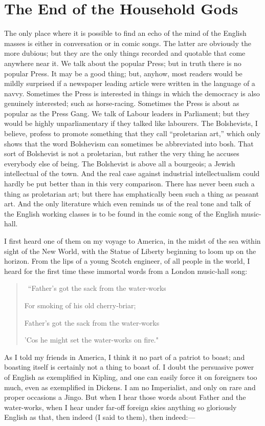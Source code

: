 \documentclass{book}
\begin{document}
\chapter{The End of the Household Gods}
\label{chapter-18}
The only place where it is possible to find an echo of the mind of the English masses is either in conversation or in comic songs. The latter are obviously the more dubious; but they are the only things recorded and quotable that come anywhere near it. We talk about the popular Press; but in truth there is no popular Press. It may be a good thing; but, anyhow, most readers would be mildly surprised if a newspaper leading article were written in the language of a navvy. Sometimes the Press is interested in things in which the democracy is also genuinely interested; such as horse-racing. Sometimes the Press is about as popular as the Press Gang. We talk of Labour leaders in Parliament; but they would be highly unparliamentary if they talked like labourers. The Bolshevists, I believe, profess to promote something that they call “proletarian art,” which only shows that the word Bolshevism can sometimes be abbreviated into bosh. That sort of Bolshevist is not a proletarian, but rather the very thing he accuses everybody else of being. The Bolshevist is above all a bourgeois; a Jewish intellectual of the town. And the real case against industrial intellectualism could hardly be put better than in this very comparison. There has never been such a thing as proletarian art; but there has emphatically been such a thing as peasant art. And the only literature which even reminds us of the real tone and talk of the English working classes is to be found in the comic song of the English music-hall.

I first heard one of them on my voyage to America, in the midst of the sea within sight of the New World, with the Statue of Liberty beginning to loom up on the horizon. From the lips of a young Scotch engineer, of all people in the world, I heard for the first time these immortal words from a London music-hall song:

\begin{quotation}\
	“Father’s got the sack from the water-works

	For smoking of his old cherry-briar;

	Father’s got the sack from the water-works

	’Cos he might set the water-works on fire."
\end{quotation}

As I told my friends in America, I think it no part of a patriot to boast; and boasting itself is certainly not a thing to boast of. I doubt the persuasive power of English as exemplified in Kipling, and one can easily force it on foreigners too much, even as exemplified in Dickens. I am no Imperialist, and only on rare and proper occasions a Jingo. But when I hear those words about Father and the water-works, when I hear under far-off foreign skies anything so gloriously English as that, then indeed (I said to them), then indeed:—
\end{document}
